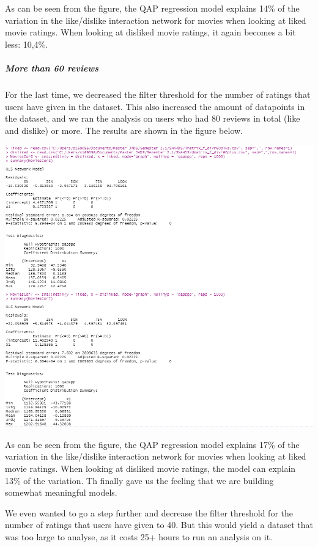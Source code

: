 \documentclass[
  man]{apa6}
\begin{document}
As can be seen from the figure, the QAP regression model explains 14\%
of the variation in the like/dislike interaction network for movies when
looking at liked movie ratings. When looking at disliked movie ratings,
it again becomes a bit less: 10,4\%.

\hypertarget{more-than-60-reviews}{%
\subparagraph{More than 60 reviews}\label{more-than-60-reviews}}

For the last time, we decreased the filter threshold for the number of
ratings that users have given in the dataset. This also increased the
amount of datapoints in the dataset, and we ran the analysis on users
who had 80 reviews in total (like and dislike) or more. The results are
shown in the figure below.

\includegraphics[width=12.29in]{results60plus}

As can be seen from the figure, the QAP regression model explains 17\%
of the variation in the like/dislike interaction network for movies when
looking at liked movie ratings. When looking at disliked movie ratings,
the model can explain 13\% of the variation. Th finally gave us the
feeling that we are building somewhat meaningful models.

We even wanted to go a step further and decrease the filter threshold
for the number of ratings that users have given to 40. But this would
yield a dataset that was too large to analyse, as it costs 25+ hours to
run an analysis on it.
\end{document}
